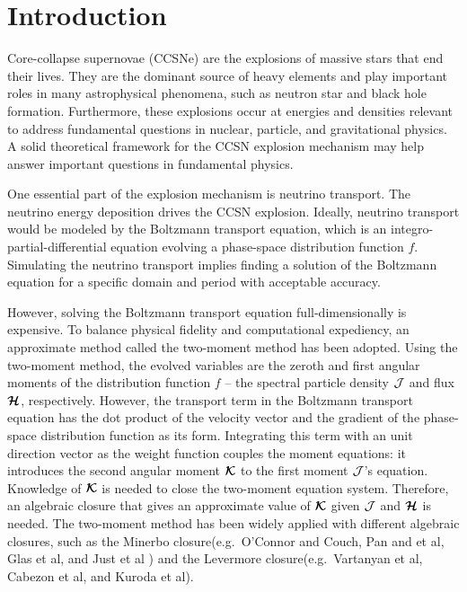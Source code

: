 \section{Introduction}

Core-collapse supernovae (CCSNe) are the explosions of massive stars that end their lives.
They are the dominant source of heavy elements and play important roles in many astrophysical phenomena, such as neutron star and black hole formation.  
Furthermore, these explosions occur at energies and densities relevant to address fundamental questions in nuclear, particle, and gravitational physics. 
A solid theoretical framework for the CCSN explosion mechanism may help answer important questions in fundamental physics.\cite{janka_etal_2007}

One essential part of the explosion mechanism is neutrino transport.
The neutrino energy deposition drives the CCSN explosion.\cite{mezzacappaMesser_1999}
Ideally, neutrino transport would be modeled by the Boltzmann transport equation, which is an integro-partial-differential equation evolving a phase-space distribution function $f$.\cite{Bruenn_1985}
Simulating the neutrino transport implies finding a solution of the Boltzmann equation for a specific domain and period with acceptable accuracy.

However, solving the Boltzmann transport equation full-dimensionally is expensive.
To balance physical fidelity and computational expediency, an approximate method called the two-moment method has been adopted.\cite{mezzacappaMesser_1999}
Using the two-moment method, the evolved variables are the zeroth and first angular moments of the distribution function $f$ -- the spectral particle density $\mathcal{J}$ and flux $\boldsymbol{\mathcal{H}}$, respectively.
However, the transport term in the Boltzmann transport equation has the dot product of the velocity vector and the gradient of the phase-space distribution function as its form.
Integrating this term with an unit direction vector as the weight function couples the moment equations: it introduces the second angular moment $\boldsymbol{\mathcal{K}}$ to the first moment $\mathcal{J}$'s equation.
Knowledge of $\boldsymbol{\mathcal{K}}$ is needed to close the two-moment equation system.
Therefore, an algebraic closure that gives an approximate value of $\boldsymbol{\mathcal{K}}$ given $\mathcal{J}$ and $\boldsymbol{\mathcal{H}}$ is needed.
The two-moment method has been widely applied with different algebraic closures, such as the Minerbo\cite{minerbo_1978} closure(e.g.~{O'Connor} and {Couch}\cite{oConnorCouch_2018}, Pan and et al\cite{pan_etal_2018}, Glas et al\cite{glas_etal_2018}, and Just et al\cite{just_etal_2018} ) and the Levermore\cite{levermore_1984} closure(e.g.~Vartanyan et al\cite{vartanyan_etal_2018}, Cabezon et al\cite{cabezon_etal_2018}, and Kuroda et al\cite{kuroda_etal_2016}). 

